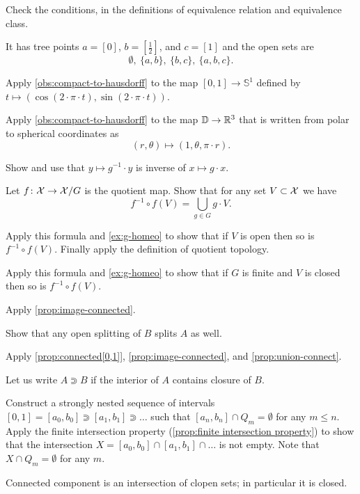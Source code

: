 \begin{multicols}{2}
Check the conditions, in the definitions of equivalence relation and equivalence class.

It has tree points $a=[0]$, $b=[\tfrac12]$, and $c=[1]$ and the open sets are 
\[\emptyset,\  \{a,b\},\ \{b,c\},\  \{a,b,c\}.\]

Apply \ref{obs:compact-to-hausdorff} to the map $[0,1]\to \mathbb{S}^1$ defined by $t\mapsto (\cos (2\cdot\pi\cdot t), \sin(2\cdot\pi\cdot t))$.

Apply \ref{obs:compact-to-hausdorff} to the map $\mathbb{D}\to \mathbb{R}^3$ that is written from polar to spherical coordinates as  
\[(r,\theta)\mapsto (1, \theta, \pi\cdot r).\]

Show and use that $y\mapsto g^{-1}\cdot y$ is inverse of $x\mapsto g\cdot x$.

\parbf{\ref{ex:quotient-map}}
Let $f\colon\mathcal{X}\to \mathcal{X}/G$ is the quotient map.
Show that for any set $V\subset \mathcal{X}$ we have
\[f^{-1}\circ f(V)=\bigcup_{g\in G}g\cdot V.\]

Apply this formula and \ref{ex:g-homeo} to show that if $V$ is open then so is $f^{-1}\circ f(V)$.
Finally apply the definition of quotient topology.

Apply this formula and \ref{ex:g-homeo} to show that if $G$ is finite and $V$ is closed then so is $f^{-1}\circ f(V)$.

 Apply \ref{prop:image-connected}.

Show that any open splitting of $B$ splits $A$ as well.

Apply \ref{prop:connected[0,1]}, \ref{prop:image-connected}, and \ref{prop:union-connect}.

Let us write $A\Supset B$ if the interior of $A$ contains closure of $B$.

Construct a strongly nested sequence of intervals $[0,1]=[a_0,b_0]\Supset[a_1,b_1]\Supset\dots$ such that $[a_n,b_n]\cap Q_m=\emptyset$ for any $m\le n$.
Apply the finite intersection property (\ref{prop:finite intersection property}) to show that the intersection $X=[a_0,b_0]\cap [a_1,b_1]\cap\dots$ is not empty.
Note that $X\cap Q_m=\emptyset$ for any $m$.



Connected component is an intersection of clopen sets; in particular it is closed.


\end{multicols}
